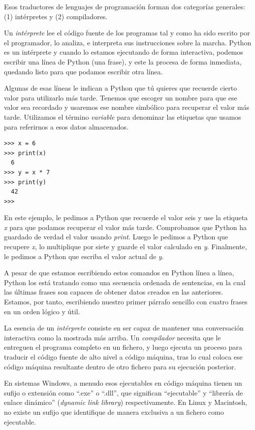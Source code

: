 Esos traductores de lenguajes de programación forman dos categorías
generales: (1) intérpretes y (2) compiladores.

Un \emph{intérprete} lee el código fuente de los programas tal y como ha
sido escrito por el programador, lo analiza, e interpreta sus
instrucciones sobre la marcha. Python es un intérprete y cuando lo
estamos ejecutando de forma interactiva, podemos escribir una línea de
Python (una frase), y este la procesa de forma inmediata, quedando listo
para que podamos escribir otra línea.

Algunas de esas líneas le indican a Python que tú quieres que recuerde
cierto valor para utilizarlo más tarde. Tenemos que escoger un nombre
para que ese valor sea recordado y usaremos ese nombre simbólico para
recuperar el valor más tarde. Utilizamos el término \emph{variable} para
denominar las etiquetas que usamos para referirnos a esos datos
almacenados.

\begin{Verbatim}[frame=single]
>>> x = 6
>>> print(x)
  6
>>> y = x * 7
>>> print(y)
  42
>>>
\end{Verbatim}
En este ejemplo, le pedimos a Python que recuerde el valor seis y use la
etiqueta \emph{x} para que podamos recuperar el valor más tarde.
Comprobamos que Python ha guardado de verdad el valor usando
\emph{print}. Luego le pedimos a Python que recupere \emph{x}, lo
multiplique por siete y guarde el valor calculado en \emph{y}.
Finalmente, le pedimos a Python que escriba el valor actual de \emph{y}.

A pesar de que estamos escribiendo estos comandos en Python línea a
línea, Python los está tratando como una secuencia ordenada de
sentencias, en la cual las últimas frases son capaces de obtener datos
creados en las anteriores. Estamos, por tanto, escribiendo nuestro
primer párrafo sencillo con cuatro frases en un orden lógico y útil.

La esencia de un \emph{intérprete} consiste en ser capaz de mantener una
conversación interactiva como la mostrada más arriba. Un
\emph{compilador} necesita que le entreguen el programa completo en un
fichero, y luego ejecuta un proceso para traducir el código fuente de
alto nivel a código máquina, tras lo cual coloca ese código máquina
resultante dentro de otro fichero para su ejecución posterior.

En sistemas Windows, a menudo esos ejecutables en código máquina tienen
un sufijo o extensión como ``.exe'' o ``.dll'', que significan
``ejecutable'' y ``librería de enlace dinámico'' (\emph{dynamic link
library}) respectivamente. En Linux y Macintosh, no existe un sufijo que
identifique de manera exclusiva a un fichero como ejecutable.

